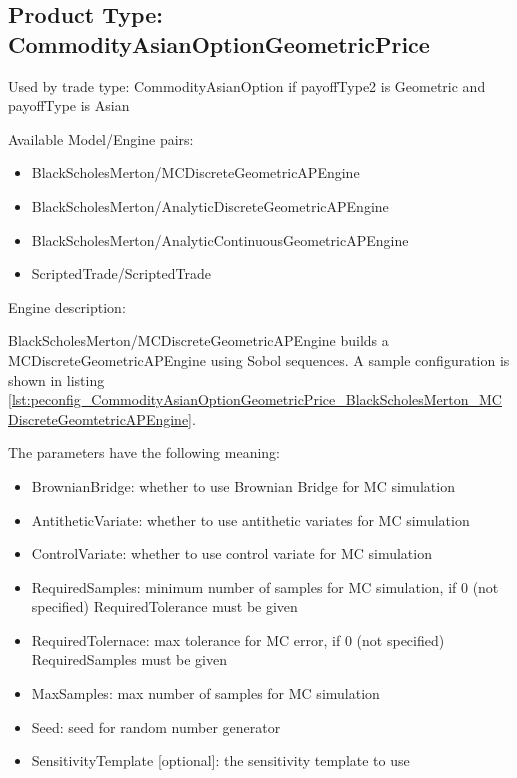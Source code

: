 \subsection{Product Type: CommodityAsianOptionGeometricPrice}

Used by trade type: CommodityAsianOption if payoffType2 is Geometric and payoffType is Asian

Available Model/Engine pairs:

\begin{itemize}
  \item BlackScholesMerton/MCDiscreteGeometricAPEngine
  \item BlackScholesMerton/AnalyticDiscreteGeometricAPEngine
  \item BlackScholesMerton/AnalyticContinuousGeometricAPEngine
  \item ScriptedTrade/ScriptedTrade
\end{itemize}

Engine description:

BlackScholesMerton/MCDiscreteGeometricAPEngine builds a MCDiscreteGeometricAPEngine using Sobol sequences. A sample
configuration is shown in listing
\ref{lst:peconfig_CommodityAsianOptionGeometricPrice_BlackScholesMerton_MCDiscreteGeomtetricAPEngine}.

The parameters have the following meaning:

\begin{itemize}
\item BrownianBridge: whether to use Brownian Bridge for MC simulation
\item AntitheticVariate: whether to use antithetic variates for MC simulation
\item ControlVariate: whether to use control variate for MC simulation
\item RequiredSamples: minimum number of samples for MC simulation, if 0 (not specified) RequiredTolerance must be given
\item RequiredTolernace: max tolerance for MC error, if 0 (not specified) RequiredSamples must be given
\item MaxSamples: max number of samples for MC simulation
\item Seed: seed for random number generator
\item SensitivityTemplate [optional]: the sensitivity template to use 
\end{itemize}

